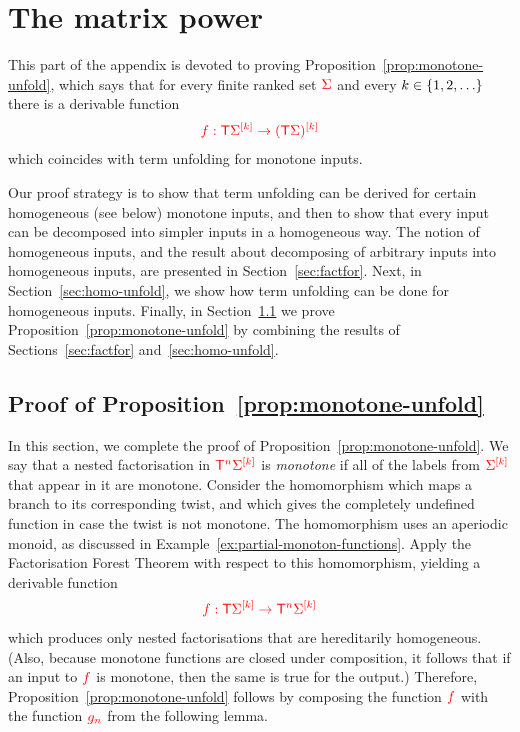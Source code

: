 \section{The matrix power}
\label{ap:matrix-power}
\newcommand{\treeunfold}{\mathrm{unfold}}

This part of the appendix is devoted to proving Proposition~\ref{prop:monotone-unfold}, which says that  for  every finite ranked set $\rSigma$ and every $k \in \set{1,2,\ldots}$ there is a derivable function 
    \begin{align*}
    \ranked{ f : \tmonad \mati k \Sigma \to \mati k {(\tmonad \Sigma)}}
    \end{align*}
    which coincides with term unfolding for monotone inputs.


Our proof strategy is to show that term unfolding can be derived for certain homogeneous (see below) monotone inputs, and then to show that every input can be decomposed into simpler inputs in a homogeneous way. The notion of homogeneous inputs, and the result about  decomposing of arbitrary inputs into homogeneous inputs, are presented in Section~\ref{sec:factfor}. Next, in Section~\ref{sec:homo-unfold}, we show how term unfolding can be done for homogeneous inputs. Finally, in Section~\ref{sec:monotone-unfold-proof} we prove Proposition~\ref{prop:monotone-unfold} by combining  the results of Sections~\ref{sec:factfor} and~\ref{sec:homo-unfold}.




\subsection{Proof of Proposition~\ref{prop:monotone-unfold}}
\label{sec:monotone-unfold-proof}
In this section, we complete the proof of Proposition~\ref{prop:monotone-unfold}.  We say that a nested factorisation in $\tmonadn n \mati k \rSigma$ is \emph{monotone} if all of the labels from $\mati k \rSigma$ that appear in it are monotone. 
Consider the homomorphism which maps a branch to its corresponding twist, and which gives the completely undefined function in case the twist is not monotone.  The homomorphism uses an aperiodic monoid, as discussed in Example~\ref{ex:partial-monoton-functions}. 
 Apply the Factorisation Forest Theorem with respect to this homomorphism, yielding a derivable function
\begin{align*}
\ranked{ f : \tmonad \mati k \rSigma \to \tmonadn n \mati k \rSigma}
\end{align*}
which produces only nested factorisations that are  hereditarily homogeneous. (Also, because monotone functions are closed under composition, it follows that if  an input to $\ranked f$ is monotone, then the same is true for the output.) Therefore,  Proposition~\ref{prop:monotone-unfold} follows by composing the function $\ranked f$ with the function $\ranked {g_n}$ from the following lemma. 

